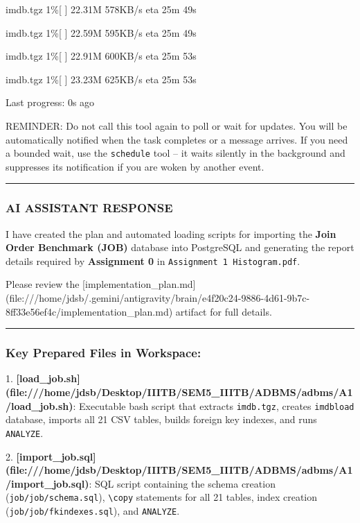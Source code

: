 \documentclass[11pt,a4paper]{article}
\begin{document}
imdb.tgz              1\%[                    ]  22.31M   578KB/s    eta 25m 49s

imdb.tgz              1\%[                    ]  22.59M   595KB/s    eta 25m 49s

imdb.tgz              1\%[                    ]  22.91M   600KB/s    eta 25m 53s

imdb.tgz              1\%[                    ]  23.23M   625KB/s    eta 25m 53s


Last progress: 0s ago



REMINDER: Do not call this tool again to poll or wait for updates. You will be automatically notified when the task completes or a message arrives. If you need a bounded wait, use the \texttt{schedule} tool -- it waits silently in the background and suppresses its notification if you are woken by another event.


\hrule

\subsubsection{AI ASSISTANT RESPONSE}

I have created the plan and automated loading scripts for importing the \textbf{Join Order Benchmark (JOB)} database into PostgreSQL and generating the report details required by \textbf{Assignment 0} in \texttt{Assignment 1 Histogram.pdf}.


Please review the [implementation\_plan.md](file:///home/jdsb/.gemini/antigravity/brain/e4f20c24-9886-4d61-9b7c-8ff33e56ef4c/implementation\_plan.md) artifact for full details.


\hrule


\subsubsection{Key Prepared Files in Workspace:}
1. \textbf{[load\_job.sh](file:///home/jdsb/Desktop/IIITB/SEM5\_IIITB/ADBMS/adbms/A1/load\_job.sh)}: Executable bash script that extracts \texttt{imdb.tgz}, creates \texttt{imdbload} database, imports all 21 CSV tables, builds foreign key indexes, and runs \texttt{ANALYZE}.

2. \textbf{[import\_job.sql](file:///home/jdsb/Desktop/IIITB/SEM5\_IIITB/ADBMS/adbms/A1/import\_job.sql)}: SQL script containing the schema creation (\texttt{job/job/schema.sql}), \texttt{\textbackslash{}copy} statements for all 21 tables, index creation (\texttt{job/job/fkindexes.sql}), and \texttt{ANALYZE}.
\end{document}
